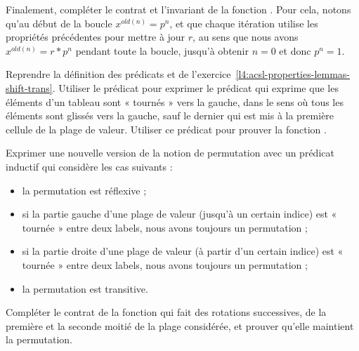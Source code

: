 Finalement, compléter le contrat et l'invariant de la fonction .
Pour cela, notons qu'au début de la boucle $x^{old(n)} = p^n$, et que chaque itération
utilise les propriétés précédentes pour mettre à jour $r$, au sens que nous avons
$x^{old(n)} = r * p^n$ pendant toute la boucle, jusqu'à obtenir $n = 0$ et donc
$p ^n = 1$.






Reprendre la définition des prédicats  et 
de l'exercice~\ref{l4:acsl-properties-lemmas-shift-trans}. Utiliser le prédicat
 pour exprimer le prédicat  qui exprime que
les éléments d'un tableau sont « tournés » vers la gauche, dans le sens où tous les
éléments sont glissés vers la gauche, sauf le dernier qui est mis à la première
cellule de la plage de valeur. Utiliser ce prédicat pour prouver la fonction
.





Exprimer une nouvelle version de la notion de permutation avec un prédicat inductif
qui considère les cas suivants :

\begin{itemize}
\item la permutation est réflexive ;
\item si la partie gauche d'une plage de valeur (jusqu'à un certain indice) est
      « tournée » entre deux labels, nous avons toujours un permutation ;
\item si la partie droite d'une plage de valeur (à partir d'un certain indice)
      est « tournée » entre deux labels, nous avons toujours un permutation ;
\item la permutation est transitive.
\end{itemize}




Compléter le contrat de la fonction  qui fait des
rotations successives, de la première et la seconde moitié de la plage
considérée, et prouver qu'elle maintient la permutation.


